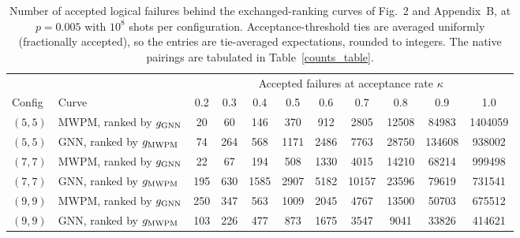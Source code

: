 \begin{table}
\centering
\begin{tabular}{ll| c c c c c c c c c}
\toprule
 & & \multicolumn{9}{c}{Accepted failures at acceptance rate $\kappa$} \\
Config & Curve & 0.2 & 0.3 & 0.4 & 0.5 & 0.6 & 0.7 & 0.8 & 0.9 & 1.0 \\
\hline
\midrule
$(5, 5)$ & MWPM, ranked by $g_{\rm GNN}$ & 20 & 60 & 146 & 370 & 912 & 2805 & 12508 & 84983 & 1404059 \\
$(5, 5)$ & GNN, ranked by $g_{\rm MWPM}$ & 74 & 264 & 568 & 1171 & 2486 & 7763 & 28750 & 134608 & 938002 \\
$(7, 7)$ & MWPM, ranked by $g_{\rm GNN}$ & 22 & 67 & 194 & 508 & 1330 & 4015 & 14210 & 68214 & 999498 \\
$(7, 7)$ & GNN, ranked by $g_{\rm MWPM}$ & 195 & 630 & 1585 & 2907 & 5182 & 10157 & 23596 & 79619 & 731541 \\
$(9, 9)$ & MWPM, ranked by $g_{\rm GNN}$ & 250 & 347 & 563 & 1009 & 2045 & 4767 & 13500 & 50703 & 675512 \\
$(9, 9)$ & GNN, ranked by $g_{\rm MWPM}$ & 103 & 226 & 477 & 873 & 1675 & 3547 & 9041 & 33826 & 414621 \\
\bottomrule
\end{tabular}
\caption{Number of accepted logical failures behind the exchanged-ranking curves of Fig.~2 and Appendix~B, at $p = 0.005$ with $10^8$ shots per configuration. Acceptance-threshold ties are averaged uniformly (fractionally accepted), so the entries are tie-averaged expectations, rounded to integers. The native pairings are tabulated in Table~\ref{counts_table}.}
\label{crossed_counts_table}
\end{table}
